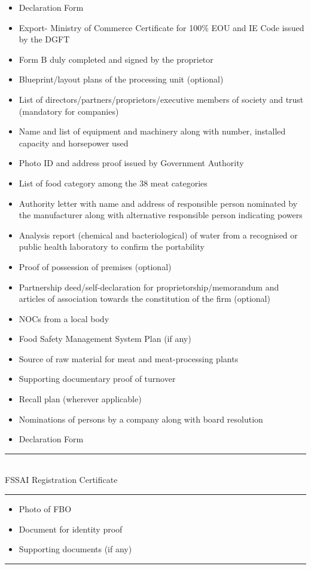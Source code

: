 \documentclass[a4paper, 12pt]{article}
\begin{document}
\begin{itemize}[noitemsep]
\item Declaration Form 
\item Export- Ministry of Commerce Certificate for 100\% EOU and IE Code issued by the DGFT 
\item Form B duly completed and signed by the proprietor
\item Blueprint/layout plans of the processing unit (optional) 
\item List of directors/partners/proprietors/executive members of society and trust (mandatory for companies) 
\item Name and list of equipment and machinery along with number, installed capacity and horsepower used 
\item Photo ID and address proof issued by Government Authority 
\item List of food category among the 38 meat categories 
\item Authority letter with name and address of responsible person nominated by the manufacturer along with alternative responsible person indicating powers 
\item Analysis report (chemical and bacteriological) of water from a recognised or public health laboratory to confirm the portability 
\item Proof of possession of premises (optional) 
\item Partnership deed/self-declaration for proprietorship/memorandum and articles of association towards the constitution of the firm (optional) 
\item NOCs from a local body 
\item Food Safety Management System Plan (if any) 
\item Source of raw material for meat and meat-processing plants 
\item Supporting documentary proof of turnover 
\item Recall plan (wherever applicable) 
\item Nominations of persons by a company along with board resolution 
\item Declaration Form 
\end{itemize}
\noindent\rule{16cm}{0.4pt}\\
FSSAI Registration Certificate\\
\noindent\rule{16cm}{0.4pt}
\begin{itemize}[noitemsep]
\item Photo of FBO 
\item Document for identity proof 
\item Supporting documents (if any) 
\end{itemize}
\noindent\rule{16cm}{0.4pt}\\
\newpage
\end{document}
